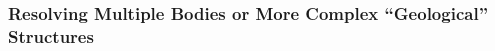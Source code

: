 \documentclass[preprint,authoryear,12pt]{elsarticle}
\providecommand{\DIFdelend}{} %
\begin{document}

\DIFdelend \subsubsection{Resolving Multiple Bodies or More Complex ``Geological'' Structures}
\label{sec:RingArray_Development_Horseshoe_Synth_GeologicalTarget}
\end{document}
